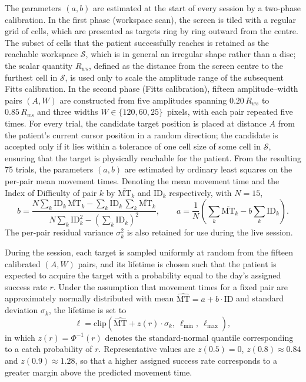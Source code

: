 \documentclass[11pt,a4paper]{article}
\begin{document}
The parameters $(a, b)$ are estimated at the start of every session by a two-phase calibration. In the first phase (workspace scan), the screen is tiled with a regular grid of cells, which are presented as targets ring by ring outward from the centre. The subset of cells that the patient successfully reaches is retained as the reachable workspace $\mathcal{S}$, which is in general an irregular shape rather than a disc; the scalar quantity $R_{ws}$, defined as the distance from the screen centre to the furthest cell in $\mathcal{S}$, is used only to scale the amplitude range of the subsequent Fitts calibration. In the second phase (Fitts calibration), fifteen amplitude--width pairs $(A, W)$ are constructed from five amplitudes spanning $0.20\,R_{ws}$ to $0.85\,R_{ws}$ and three widths $W \in \{120, 60, 25\}$~pixels, with each pair repeated five times. For every trial, the candidate target position is placed at distance $A$ from the patient's current cursor position in a random direction; the candidate is accepted only if it lies within a tolerance of one cell size of some cell in $\mathcal{S}$, ensuring that the target is physically reachable for the patient. From the resulting 75 trials, the parameters $(a, b)$ are estimated by ordinary least squares on the per-pair mean movement times. Denoting the mean movement time and the Index of Difficulty of pair $k$ by $\overline{\text{MT}}_k$ and $\text{ID}_k$ respectively, with $N = 15$,
\begin{equation}
    b = \frac{N \sum_k \text{ID}_k\, \overline{\text{MT}}_k - \sum_k \text{ID}_k\, \sum_k \overline{\text{MT}}_k}{N \sum_k \text{ID}_k^2 - \left(\sum_k \text{ID}_k\right)^2}, \qquad a = \frac{1}{N}\!\left(\sum_k \overline{\text{MT}}_k - b \sum_k \text{ID}_k\right).
\end{equation}
The per-pair residual variance $\sigma_k^2$ is also retained for use during the live session.

During the session, each target is sampled uniformly at random from the fifteen calibrated $(A, W)$ pairs, and its lifetime is chosen such that the patient is expected to acquire the target with a probability equal to the day's assigned success rate $r$. Under the assumption that movement times for a fixed pair are approximately normally distributed with mean $\widehat{\text{MT}} = a + b \cdot \text{ID}$ and standard deviation $\sigma_k$, the lifetime is set to
\begin{equation}
    \ell = \mathrm{clip}\!\left( \widehat{\text{MT}} + z(r) \cdot \sigma_k,\ \ell_{\min},\ \ell_{\max} \right),
\end{equation}
in which $z(r) = \Phi^{-1}(r)$ denotes the standard-normal quantile corresponding to a catch probability of $r$. Representative values are $z(0.5) = 0$, $z(0.8) \approx 0.84$ and $z(0.9) \approx 1.28$, so that a higher assigned success rate corresponds to a greater margin above the predicted movement time.
\end{document}
